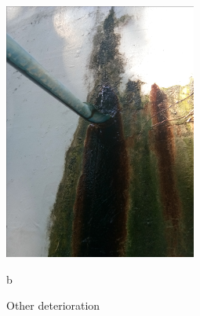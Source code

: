\begin{figure}
\begin{minipage}[b]{0.3\linewidth}
		\includegraphics[width=\textwidth]{figures/fig_ch043_reservoir_leakage}
		\caption*{b}
	\end{minipage}
	
	\caption{Other deterioration}
	\label{otherdamages}
\end{figure}	



